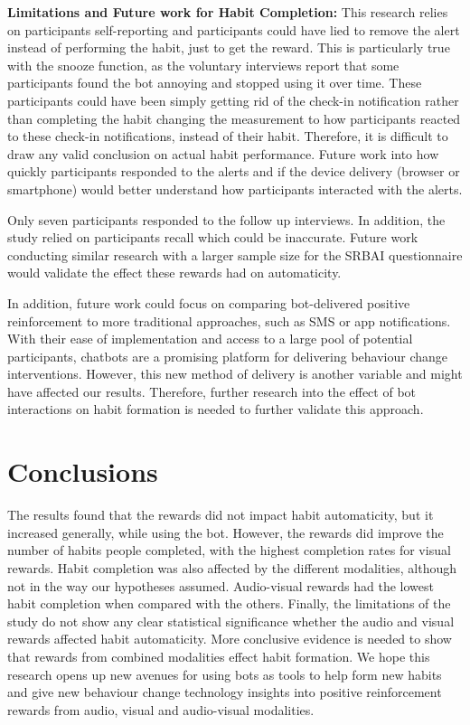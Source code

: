 \documentclass{scaffold/sigchi}
\begin{document}
\textbf{Limitations and Future work for Habit Completion:} This research relies on participants self-reporting and participants could have lied to remove the alert instead of performing the habit, just to get the reward. This is particularly true with the snooze function, as the voluntary interviews report that some participants found the bot annoying and stopped using it over time. These participants could have been simply getting rid of the check-in notification rather than completing the habit changing the measurement to how participants reacted to these check-in notifications, instead of their habit. Therefore, it is difficult to draw any valid conclusion on actual habit performance. Future work into how quickly participants responded to the alerts and if the device delivery (browser or smartphone) would better understand how participants interacted with the alerts.



Only seven participants responded to the follow up interviews. In addition, the study relied on participants recall which could be inaccurate. Future work conducting similar research with a larger sample size for the SRBAI questionnaire would validate the effect these rewards had on automaticity.

In addition, future work could focus on comparing bot-delivered positive reinforcement to more traditional approaches, such as SMS or app notifications. With their ease of implementation and access to a large pool of potential participants, chatbots are a promising platform for delivering behaviour change interventions. However, this new method of delivery is another variable and might have affected our results. Therefore, further research into the effect of bot interactions on habit formation is needed to further validate this approach.   

\section{Conclusions}
The results found that the rewards did not impact habit automaticity, but it increased generally, while using the bot. However, the rewards did improve the number of habits people completed, with the highest completion rates for visual rewards. Habit completion was also affected by the different modalities, although not in the way our hypotheses assumed. Audio-visual rewards had the lowest habit completion when compared with the others. Finally, the limitations of the study do not show any clear statistical significance whether the audio and visual rewards affected habit automaticity. More conclusive evidence is needed to show that rewards from combined modalities effect habit formation. We hope this research opens up new avenues for using bots as tools to help form new habits and give new behaviour change technology insights into positive reinforcement rewards from audio, visual and audio-visual modalities.
\end{document}
